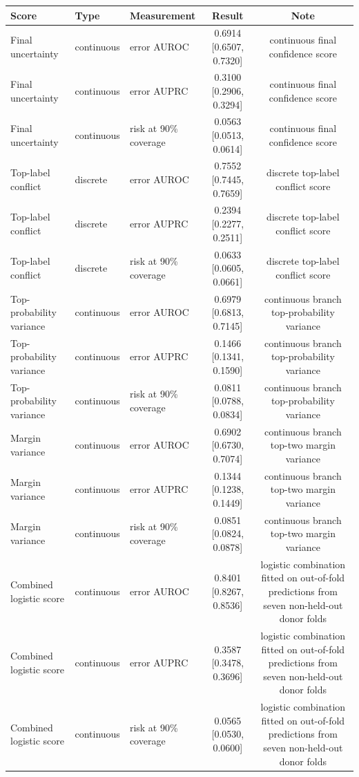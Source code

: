 \begin{tabular}{lllcc}
\toprule
Score & Type & Measurement & Result & Note \\
\midrule
Final uncertainty & continuous & error AUROC & 0.6914 [0.6507, 0.7320] & continuous final confidence score \\
Final uncertainty & continuous & error AUPRC & 0.3100 [0.2906, 0.3294] & continuous final confidence score \\
Final uncertainty & continuous & risk at 90\% coverage & 0.0563 [0.0513, 0.0614] & continuous final confidence score \\
Top-label conflict & discrete & error AUROC & 0.7552 [0.7445, 0.7659] & discrete top-label conflict score \\
Top-label conflict & discrete & error AUPRC & 0.2394 [0.2277, 0.2511] & discrete top-label conflict score \\
Top-label conflict & discrete & risk at 90\% coverage & 0.0633 [0.0605, 0.0661] & discrete top-label conflict score \\
Top-probability variance & continuous & error AUROC & 0.6979 [0.6813, 0.7145] & continuous branch top-probability variance \\
Top-probability variance & continuous & error AUPRC & 0.1466 [0.1341, 0.1590] & continuous branch top-probability variance \\
Top-probability variance & continuous & risk at 90\% coverage & 0.0811 [0.0788, 0.0834] & continuous branch top-probability variance \\
Margin variance & continuous & error AUROC & 0.6902 [0.6730, 0.7074] & continuous branch top-two margin variance \\
Margin variance & continuous & error AUPRC & 0.1344 [0.1238, 0.1449] & continuous branch top-two margin variance \\
Margin variance & continuous & risk at 90\% coverage & 0.0851 [0.0824, 0.0878] & continuous branch top-two margin variance \\
Combined logistic score & continuous & error AUROC & 0.8401 [0.8267, 0.8536] & logistic combination fitted on out-of-fold predictions from seven non-held-out donor folds \\
Combined logistic score & continuous & error AUPRC & 0.3587 [0.3478, 0.3696] & logistic combination fitted on out-of-fold predictions from seven non-held-out donor folds \\
Combined logistic score & continuous & risk at 90\% coverage & 0.0565 [0.0530, 0.0600] & logistic combination fitted on out-of-fold predictions from seven non-held-out donor folds \\

\end{tabular}
